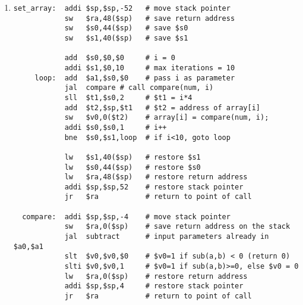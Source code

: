 \documentclass[12pt]{article}
\begin{document}
    \begin{enumerate}
        \item
        \begin{verbatim}
set_array:  addi $sp,$sp,-52   # move stack pointer
            sw   $ra,48($sp)   # save return address
            sw   $s0,44($sp)   # save $s0
            sw   $s1,40($sp)   # save $s1

            add  $s0,$0,$0     # i = 0
            addi $s1,$0,10     # max iterations = 10
     loop:  add  $a1,$s0,$0    # pass i as parameter
            jal  compare # call compare(num, i)
            sll  $t1,$s0,2     # $t1 = i*4
            add  $t2,$sp,$t1   # $t2 = address of array[i]
            sw   $v0,0($t2)    # array[i] = compare(num, i);
            addi $s0,$s0,1     # i++
            bne  $s0,$s1,loop  # if i<10, goto loop

            lw   $s1,40($sp)   # restore $s1
            lw   $s0,44($sp)   # restore $s0
            lw   $ra,48($sp)   # restore return address
            addi $sp,$sp,52    # restore stack pointer
            jr   $ra           # return to point of call

  compare:  addi $sp,$sp,-4    # move stack pointer
            sw   $ra,0($sp)    # save return address on the stack
            jal  subtract      # input parameters already in $a0,$a1
            slt  $v0,$v0,$0    # $v0=1 if sub(a,b) < 0 (return 0)
            slti $v0,$v0,1     # $v0=1 if sub(a,b)>=0, else $v0 = 0
            lw   $ra,0($sp)    # restore return address
            addi $sp,$sp,4     # restore stack pointer
            jr   $ra           # return to point of call


\end{verbatim}
\end{enumerate}
\end{document}
